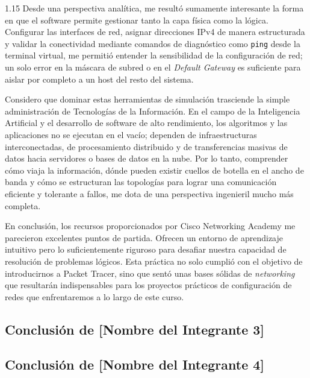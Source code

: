 \documentclass[11pt, a4paper]{article}
\begin{document}
\begin{spacing}{1.15}
Desde una perspectiva analítica, me resultó sumamente interesante la forma en que el software permite gestionar tanto la capa física como la lógica. Configurar las interfaces de red, asignar direcciones IPv4 de manera estructurada y validar la conectividad mediante comandos de diagnóstico como \texttt{ping} desde la terminal virtual, me permitió entender la sensibilidad de la configuración de red; un solo error en la máscara de subred o en el \textit{Default Gateway} es suficiente para aislar por completo a un host del resto del sistema.

Considero que dominar estas herramientas de simulación trasciende la simple administración de Tecnologías de la Información. En el campo de la Inteligencia Artificial y el desarrollo de software de alto rendimiento, los algoritmos y las aplicaciones no se ejecutan en el vacío; dependen de infraestructuras interconectadas, de procesamiento distribuido y de transferencias masivas de datos hacia servidores o bases de datos en la nube. Por lo tanto, comprender cómo viaja la información, dónde pueden existir cuellos de botella en el ancho de banda y cómo se estructuran las topologías para lograr una comunicación eficiente y tolerante a fallos, me dota de una perspectiva ingenieril mucho más completa.

En conclusión, los recursos proporcionados por Cisco Networking Academy me parecieron excelentes puntos de partida. Ofrecen un entorno de aprendizaje intuitivo pero lo suficientemente riguroso para desafiar nuestra capacidad de resolución de problemas lógicos. Esta práctica no solo cumplió con el objetivo de introducirnos a Packet Tracer, sino que sentó unas bases sólidas de \textit{networking} que resultarán indispensables para los proyectos prácticos de configuración de redes que enfrentaremos a lo largo de este curso.

\clearpage

\subsection{Conclusión de [Nombre del Integrante 3]}


\clearpage

\subsection{Conclusión de [Nombre del Integrante 4]}


\clearpage


\end{spacing}
\end{document}
